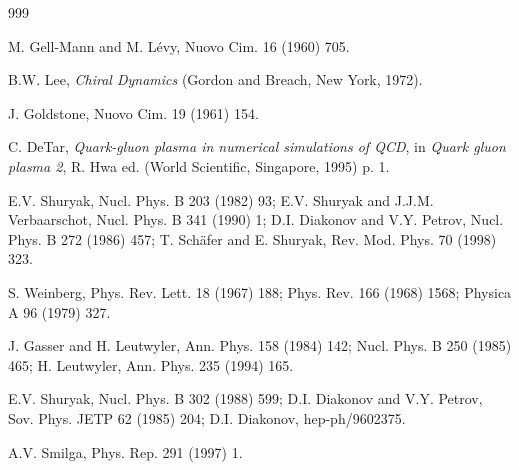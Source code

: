 \begin{thebibliography}{999}

   M. Gell-Mann and M. L\'evy,
                      Nuovo Cim. 16 (1960) 705.           %

      B.W. Lee,
                      {\it Chiral Dynamics}
                      (Gordon and Breach, New York, 1972).  %

   J. Goldstone, 
                      Nuovo Cim. 19 (1961) 154.           %

       C. DeTar,
                      {\it Quark-gluon plasma in numerical simulations of QCD},
                      in {\it Quark gluon plasma 2}, R. Hwa ed.
                      (World Scientific, Singapore, 1995) p. 1.

  E.V. Shuryak, 
                      Nucl. Phys. B 203 (1982) 93;       %
                      E.V. Shuryak and J.J.M. Verbaarschot, 
                      Nucl. Phys. B 341 (1990) 1;        %
                      D.I. Diakonov and V.Y. Petrov, 
                      Nucl. Phys. B 272 (1986) 457;      %
                      T. Sch\"afer and E. Shuryak,
                      Rev. Mod. Phys. 70 (1998) 323.     %

    S. Weinberg,
                      Phys. Rev. Lett. 18 (1967) 188;    %
                      Phys. Rev. 166 (1968) 1568;        %
                      Physica A 96 (1979) 327.           %

         J. Gasser and H. Leutwyler, 
                      Ann. Phys. 158 (1984) 142;         %
                      Nucl. Phys. B 250 (1985) 465;      %
                      H. Leutwyler, 
                      Ann. Phys. 235 (1994) 165.         %

     E.V. Shuryak, 
                      Nucl. Phys. B 302 (1988) 599;      %
                      D.I. Diakonov and V.Y. Petrov, 
                      Sov. Phys. JETP 62 (1985) 204;     %
                      D.I. Diakonov, 
                      hep-ph/9602375.                    %

     A.V. Smilga, 
                      Phys. Rep. 291 (1997) 1.           %


\end{thebibliography}
